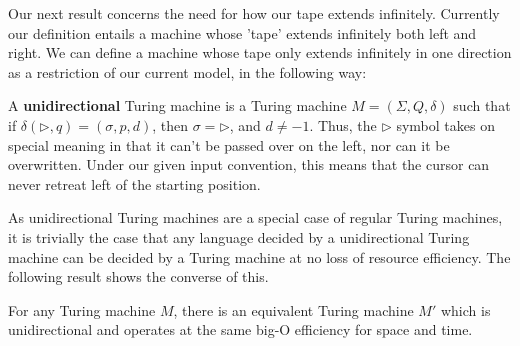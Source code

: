 Our next result concerns the need for how our tape extends infinitely. Currently our definition entails a machine whose 'tape' extends infinitely both left and right. We can define a machine whose tape only extends infinitely in one direction as a restriction of our current model, in the following way:
\begin{definition}
	A \textbf{unidirectional} Turing machine is a Turing machine $M = (\Sigma,Q,\delta)$ such that if $\delta(\triangleright,q) = (\sigma,p,d)$, then $\sigma = \triangleright$, and $d \neq -1$. Thus, the $\triangleright$ symbol takes on special meaning in that it can't be passed over on the left, nor can it be overwritten. Under our given input convention, this means that the cursor can never retreat left of the starting position.
\end{definition}
As unidirectional Turing machines are a special case of regular Turing machines, it is trivially the case that any language decided by a unidirectional Turing machine can be decided by a Turing machine at no loss of resource efficiency. The following result shows the converse of this.
\begin{lemma}
	For any Turing machine $M$, there is an equivalent Turing machine $M'$ which is unidirectional and operates at the same big-O efficiency for space and time.
\end{lemma}
